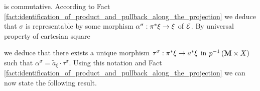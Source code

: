 is commutative. According to Fact \ref{fact:identification_of_product_and_pullback_along_the_projection} we deduce that $\sigma$ is representable by some morphism $\alpha^{\sigma}:\pi^*\xi\rightarrow \xi$ of ${\mathcal E}$. By universal property of cartesian square
\begin{center}
\end{center}
we deduce that there exists a unique morphism $\tau^{\sigma}:\pi^*\xi\rightarrow a^*\xi$ in $p^{-1}\left(\mathbf{M}\times X\right)$ such that $\alpha^{\sigma} = \widetilde{a}_{\xi}\cdot \tau^{\sigma}$. Using this notation and Fact \ref{fact:identification_of_product_and_pullback_along_the_projection} we can now state the following result.

